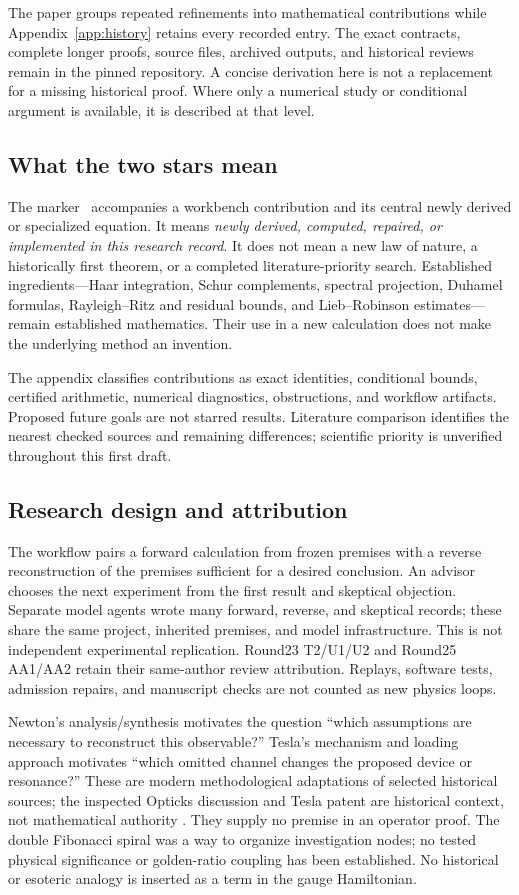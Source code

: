 The paper groups repeated refinements into mathematical contributions while Appendix~\ref{app:history} retains every recorded entry. The exact contracts, complete longer proofs, source files, archived outputs, and historical reviews remain in the pinned repository. A concise derivation here is not a replacement for a missing historical proof. Where only a numerical study or conditional argument is available, it is described at that level.

\subsection{What the two stars mean}
The marker \workstar\ accompanies a workbench contribution and its central newly derived or specialized equation. It means \emph{newly derived, computed, repaired, or implemented in this research record}. It does not mean a new law of nature, a historically first theorem, or a completed literature-priority search. Established ingredients---Haar integration, Schur complements, spectral projection, Duhamel formulas, Rayleigh--Ritz and residual bounds, and Lieb--Robinson estimates---remain established mathematics. Their use in a new calculation does not make the underlying method an invention.

The appendix classifies contributions as exact identities, conditional bounds, certified arithmetic, numerical diagnostics, obstructions, and workflow artifacts. Proposed future goals are not starred results. Literature comparison identifies the nearest checked sources and remaining differences; scientific priority is unverified throughout this first draft.

\subsection{Research design and attribution}
The workflow pairs a forward calculation from frozen premises with a reverse reconstruction of the premises sufficient for a desired conclusion. An advisor chooses the next experiment from the first result and skeptical objection. Separate model agents wrote many forward, reverse, and skeptical records; these share the same project, inherited premises, and model infrastructure. This is not independent experimental replication. Round23 T2/U1/U2 and Round25 AA1/AA2 retain their same-author review attribution. Replays, software tests, admission repairs, and manuscript checks are not counted as new physics loops.

Newton's analysis/synthesis motivates the question ``which assumptions are necessary to reconstruct this observable?'' Tesla's mechanism and loading approach motivates ``which omitted channel changes the proposed device or resonance?'' These are modern methodological adaptations of selected historical sources; the inspected Opticks discussion and Tesla patent are historical context, not mathematical authority \cite{newton_opticks,tesla1905patent}. They supply no premise in an operator proof. The double Fibonacci spiral was a way to organize investigation nodes; no tested physical significance or golden-ratio coupling has been established. No historical or esoteric analogy is inserted as a term in the gauge Hamiltonian.

